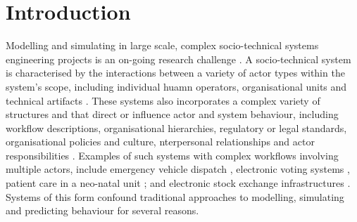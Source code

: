 \documentclass{sig-alternate}
\begin{document}

\section{Introduction}


Modelling and simulating in large scale, complex socio-technical systems
engineering projects is an on-going research challenge \citep{baxter08learning}.
A socio-technical system is characterised by the interactions between a variety
of actor types within the system's scope, including individual huamn operators,
organisational units and technical artifacts
\citep{elhassan07role,sommerville08socio}. These systems also incorporates a
complex variety of structures and that direct or influence actor and system
behaviour, including workflow descriptions, organisational hierarchies,
regulatory or legal standards, organisational policies and culture, nterpersonal
relationships and actor responsibilities
\citep{bade07structures,pentland05organisational}. Examples of such systems with
complex workflows involving multiple actors, include emergency vehicle dispatch
\citep{robinson96limited}, electronic voting systems
\citep{bryans04towards,lock07observations}, patient care in a neo-natal unit
\citep{baxter07evaluating}; and electronic stock exchange infrastructures
\citep{cftc-sec10findings}.  Systems of this form confound traditional approaches
to modelling, simulating and predicting behaviour for several reasons.
\end{document}
